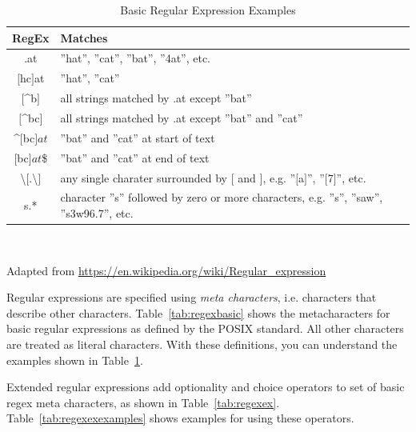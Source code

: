\begin{table}[h]
\small 
\centering

\renewcommand{\arraystretch}{1.25}

\begin{tabularx}{\textwidth}{c|X} \hline
{\bf RegEx} & {\bf Matches} \\ \hline \hline
.at & ''hat'', ''cat'', ''bat'', ''4at'', etc. \\ \hline
$[$hc$]$at & ''hat'', ''cat'' \\ \hline
$[$\^{ }b$]$ & all strings matched by .at except ''bat'' \\ \hline
$[$\^{ }bc$]$ & all strings matched by .at except ''bat'' and ''cat'' \\ \hline
\^{ }$[$bc$]at$ & ''bat'' and ''cat'' at start of text \\ \hline
$[$bc$]at$\$ & ''bat'' and ''cat'' at end of text \\ \hline
\textbackslash $[$.\textbackslash$]$ & any single charater surrounded by $[$ and $]$, e.g. ''$[$a$]$'', ''$[$7$]$'', etc. \\ \hline
s.* & character ''s'' followed by zero or more characters, e.g. ''s'', ''saw'', ''s3w96.7'', etc. \\ \hline
\end{tabularx} \\
\vspace{.5\baselineskip}

{\footnotesize Adapted from \url{https://en.wikipedia.org/wiki/Regular_expression}} 

\caption{Basic Regular Expression Examples}
\label{tab:regexbasicexamples}
\end{table}

Regular expressions are specified using \emph{meta characters}, i.e. characters that describe other characters. Table~\ref{tab:regexbasic} shows the metacharacters for basic regular expressions as defined by the POSIX standard. All other characters are treated as literal characters. With these definitions, you can understand the examples shown in Table~\ref{tab:regexbasicexamples}.

Extended regular expressions add optionality and choice operators to set of basic regex meta characters, as shown in Table~\ref{tab:regexex}. Table~\ref{tab:regexexexamples} shows examples for using these operators.

